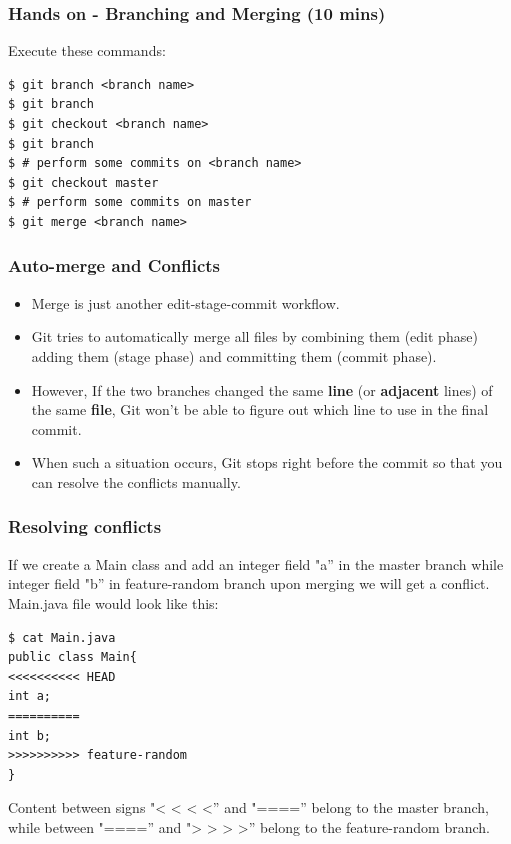 \documentclass{beamer}
\begin{document}
\begin{frame}[fragile]
\frametitle{Hands on - Branching and Merging (10 mins)}

Execute these commands:

\begin{lstlisting}
$ git branch <branch name>
$ git branch
$ git checkout <branch name>
$ git branch
$ # perform some commits on <branch name>
$ git checkout master
$ # perform some commits on master
$ git merge <branch name>
\end{lstlisting}
\end{frame}

\begin{frame}
\frametitle{Auto-merge and Conflicts}

\begin{itemize}

\item Merge is just another edit-stage-commit workflow.

\item Git tries to automatically merge all files by combining them (edit
phase) adding them (stage phase) and committing them (commit phase).

\item However, If the two branches changed the same \textbf{line}
(or \textbf{adjacent} lines) of the same \textbf{file}, Git won't be able to figure out which
line to use in the final commit. 

\item When such a situation occurs, Git stops right before the commit so that
you can resolve the conflicts manually.

\end{itemize}

\end{frame}

\begin{frame}[fragile]
\frametitle{Resolving conflicts}
If we create a Main class and add an integer field "a'' in the master
branch while integer field "b'' in feature-random branch upon merging
we will get a conflict. Main.java file would look like this:
\begin{lstlisting}
$ cat Main.java
public class Main{
<<<<<<<<<< HEAD
int a;
==========
int b;
>>>>>>>>>> feature-random
}
\end{lstlisting}
Content between signs "< < < <'' and "===='' belong to the master
branch, while between "===='' and "> > > >'' belong to the
feature-random branch.
\end{frame}
\end{document}
